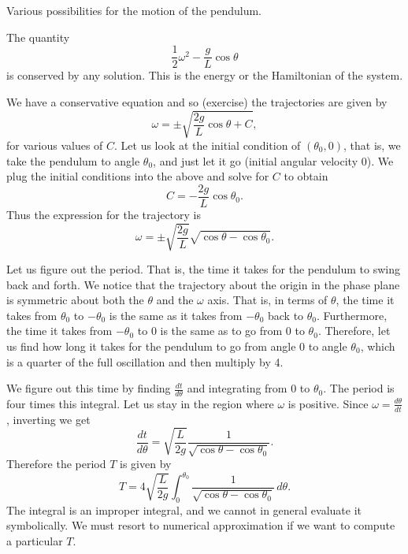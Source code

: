 \begin{myfig}
\capstart
{}
\caption{Various possibilities for the motion of the pendulum. \label{fig:nlin-pend}}
\end{myfig}

The quantity 
\begin{equation*}
\frac{1}{2} \omega^2  - \frac{g}{L} \cos \theta 
\end{equation*}
is conserved by any solution.  This is the energy or the Hamiltonian of
the system.

We have a conservative equation and so (exercise) the
trajectories are given by
\begin{equation*}
\omega = \pm \sqrt{ \frac{2g}{L} \cos \theta + C} ,
\end{equation*}
for various values of $C$.  
Let us look at the initial condition of $(\theta_0,0)$,
that is, we take the pendulum to
angle $\theta_0$, and just let it go (initial angular velocity 0).
We plug the initial conditions into the above and solve for $C$ to obtain
\begin{equation*}
C = - \frac{2g}{L} \cos \theta_0 .
\end{equation*}
Thus the expression for the trajectory is
\begin{equation*}
\omega = \pm \sqrt{ \frac{2g}{L}} \sqrt{ \cos \theta - \cos \theta_0 } .
\end{equation*}

Let us figure out the period.  That is, the time it takes for the pendulum
to swing back and forth.
We notice that the trajectory about the
origin in the phase plane is symmetric about both the $\theta$ and the
$\omega$ axis.  That is, in terms of $\theta$,
the time it takes from $\theta_0$ to $-\theta_0$
is the same as it takes from $-\theta_0$ back to $\theta_0$.  Furthermore,
the time it takes from $-\theta_0$ to $0$ is the same as to go from $0$ to
$\theta_0$.  Therefore, let us find how long it takes for
the pendulum to go from angle 0 to angle $\theta_0$, which is a quarter of
the full oscillation and then multiply by 4.

We figure out this time by finding
$\frac{dt}{d\theta}$ and integrating from $0$ to $\theta_0$.
The period is four times
this integral.  Let us stay in the region where $\omega$ is positive.
Since $\omega = \frac{d\theta}{dt}$, inverting we get
\begin{equation*}
\frac{dt}{d\theta} = \sqrt{\frac{L}{2g}} \frac{1}{\sqrt{\cos \theta - \cos \theta_0 }} .
\end{equation*}
Therefore the period $T$ is given by
\begin{equation*}
T = 4 \sqrt{\frac{L}{2g}} \int_0^{\theta_0} \frac{1}{\sqrt{\cos \theta -
\cos \theta_0 }}\, d\theta .
\end{equation*}
The integral is an improper integral, and we cannot in
general evaluate it symbolically.  We must resort to numerical
approximation if we want to compute a particular $T$.

